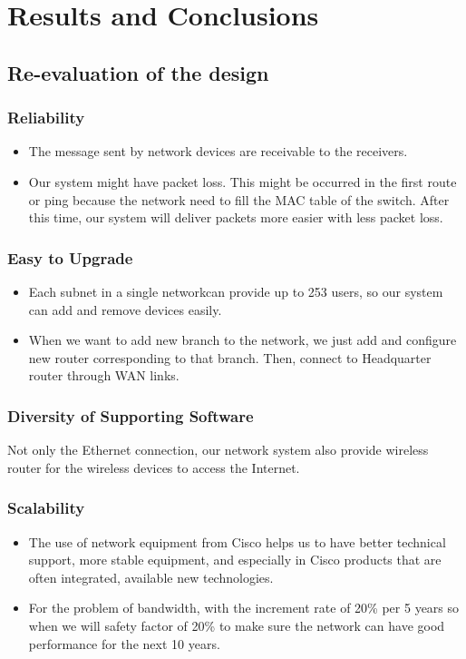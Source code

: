 \section{Results and Conclusions}
\subsection{Re-evaluation of the design}
\subsubsection{Reliability}
\begin{itemize}
  \item The message sent by network devices are receivable to the receivers.
  \item Our system might have packet loss. This might be occurred in the first route or ping because the network need to fill the MAC table of the switch. After this time, our system will deliver packets more easier with less packet loss.
\end{itemize}

\subsubsection{Easy to Upgrade}
\begin{itemize}
  \item Each subnet in a single networkcan provide up to 253 users, so our system can add and remove devices easily.
  \item When we want to add new branch to the network, we just add and configure new router corresponding to that branch. Then, connect to Headquarter router through WAN links.
\end{itemize}

\subsubsection{Diversity of Supporting Software}
Not only the Ethernet connection, our network system also provide wireless router for the wireless devices to access the Internet.

\subsubsection{Scalability}
\begin{itemize}
  \item The use of network equipment from Cisco
        helps us to have better technical support, more stable equipment, and especially in
        Cisco products that are often integrated, available new technologies.
  \item For the problem of bandwidth, with the increment rate of 20\% per 5 years so when we will safety factor of 20\% to make sure the network can have good performance for the next 10 years.
\end{itemize}

